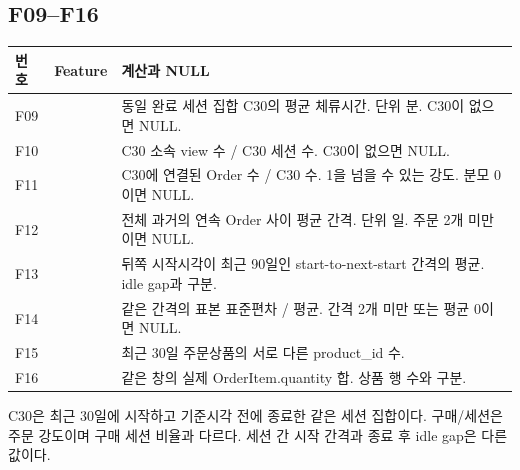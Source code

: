 \documentclass[11pt,a4paper]{article}
\newcommand{\page}{\clearpage}
\newcommand{\thead}{\rowcolor{pale}}
\begin{document}
\subsection*{F09--F16}
\begin{tabularx}{\linewidth}{@{}P{.065\linewidth}P{.36\linewidth}Y@{}}\thead 번호 & Feature & 계산과 NULL\\\midrule
F09 & {\ttfamily\scriptsize{}} & 동일 완료 세션 집합 C30의 평균 체류시간. 단위 분. C30이 없으면 NULL. \\[5pt]
F10 & {\ttfamily\scriptsize{}} & C30 소속 view 수 / C30 세션 수. C30이 없으면 NULL. \\[5pt]
F11 & {\ttfamily\scriptsize{}} & C30에 연결된 Order 수 / C30 수. 1을 넘을 수 있는 강도. 분모 0이면 NULL. \\[5pt]
F12 & {\ttfamily\scriptsize{}} & 전체 과거의 연속 Order 사이 평균 간격. 단위 일. 주문 2개 미만이면 NULL. \\[5pt]
F13 & {\ttfamily\scriptsize{}} & 뒤쪽 시작시각이 최근 90일인 start-to-next-start 간격의 평균. idle gap과 구분. \\[5pt]
F14 & {\ttfamily\scriptsize{}} & 같은 간격의 표본 표준편차 / 평균. 간격 2개 미만 또는 평균 0이면 NULL. \\[5pt]
F15 & {\ttfamily\scriptsize{}} & 최근 30일 주문상품의 서로 다른 product\_id 수. \\[5pt]
F16 & {\ttfamily\scriptsize{}} & 같은 창의 실제 OrderItem.quantity 합. 상품 행 수와 구분. \\[5pt]
\bottomrule\end{tabularx}
C30은 최근 30일에 시작하고 기준시각 전에 종료한 같은 세션 집합이다. 구매/세션은 주문 강도이며 구매 세션 비율과 다르다. 세션 간 시작 간격과 종료 후 idle gap은 다른 값이다.
\page
\end{document}
